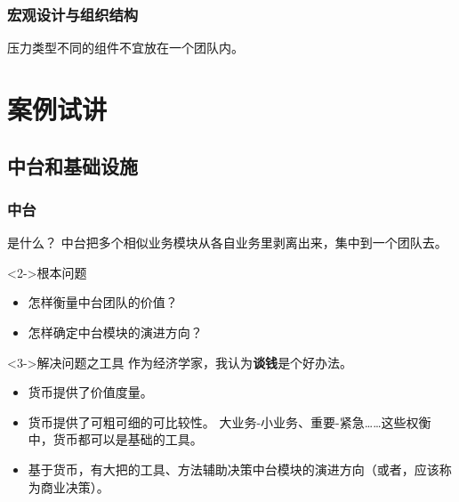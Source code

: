 \documentclass[UTF8,lualatex]{ctexbeamer}
\begin{document}
\begin{frame}
    \frametitle{宏观设计与组织结构}
    \begin{corollary}
        压力类型不同的组件不宜放在一个团队内。
    \end{corollary}
\end{frame}

\section{案例试讲}
\subsection{中台和基础设施}

\begin{frame}
    \frametitle{中台}
    \begin{block}{是什么？}
        中台把多个相似业务模块从各自业务里剥离出来，集中到一个团队去。
    \end{block}
    \begin{block}<2->{根本问题}
        \begin{itemize}
            \item 怎样衡量中台团队的价值？
            \item 怎样确定中台模块的演进方向？
        \end{itemize}
    \end{block}
    \begin{block}<3->{解决问题之工具}
        作为经济学家，我认为\textbf{谈钱}是个好办法。
        \begin{itemize}
            \item 货币提供了价值度量。
            \item 货币提供了可粗可细的可比较性。
                大业务-小业务、重要-紧急……这些权衡中，货币都可以是基础的工具。
            \item 基于货币，有大把的工具、方法辅助决策中台模块的演进方向（或者，应该称为商业决策）。
        \end{itemize}
    \end{block}
\end{frame}

\end{document}
